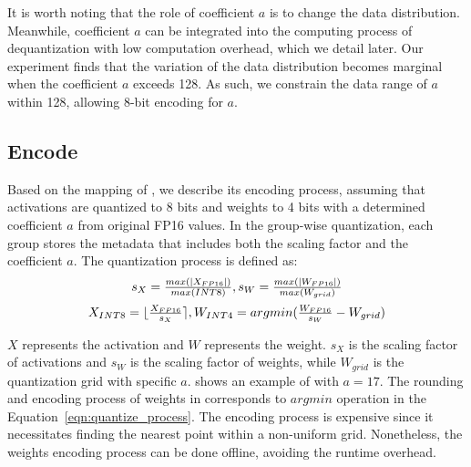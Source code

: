 It is worth noting that the role of coefficient $a$ is to change the data distribution. 
Meanwhile, coefficient $a$ can be integrated into the computing process of dequantization with low computation overhead, which we detail later. 
Our experiment finds that the variation of the data distribution becomes marginal when the coefficient $a$ exceeds 128. 
As such, we constrain the data range of $a$ within 128, allowing 8-bit encoding for $a$. 




\subsection{Encode}
\label{sec:encode_encode} 

Based on the mapping of \proj, we describe its encoding process, assuming that activations are quantized to 8 bits and weights to 4 bits with a determined coefficient $a$ from original FP16 values.
In the group-wise quantization, each group stores the metadata that includes both the scaling factor and the coefficient $a$.
The quantization process is defined as:
\begin{equation}	
    \begin{array}{c}
    s_X = \frac{max(|X_{FP16}|)}{max(INT8)},  s_W = \frac{max(|W_{FP16}|)}{max(W_{grid})}    \vspace*{0.2cm} \\
    X_{INT8} = \lfloor \frac{X_{FP16}}{s_{X}} \rceil, W_{INT4} = argmin(\frac{W_{FP16}}{s_{W}} - W_{grid})
    \end{array}
    \label{eqn:quantize_process}
\end{equation}

$X$ represents the activation and $W$ represents the weight.
$s_X$ is the scaling factor of activations and $s_W$ is the scaling factor of weights, while $W_{grid}$ is the quantization grid with specific $a$.
 shows an example of \proj with $a=17$.
The rounding and encoding process of weights in  corresponds to $argmin$ operation in the Equation~\eqref{eqn:quantize_process}.
The encoding process is expensive since it necessitates finding the nearest point within a non-uniform grid.
Nonetheless, the weights encoding process can be done offline, avoiding the runtime overhead.


